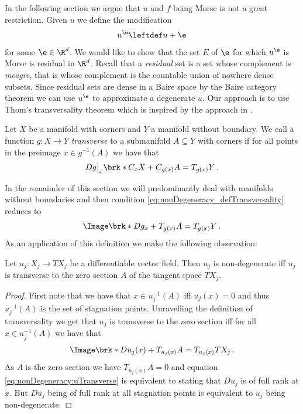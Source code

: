 In the following section we argue that 
$u$ and $f$ being Morse is not a great restriction.
Given $u$ we define the modification
\begin{align}
  u^\e\leftdef u+\e\label{eq:nonDegeneracy:definitionUEps}
\end{align}
for some $\e\in\R^d$. We would like to show that the set $E$ of $\e$ for which $u^\e$ is Morse
is residual in $\R^d$.
Recall that a \emph{residual} set is a set whose complement is \emph{meagre}, that is whose complement
is the countable union of nowhere dense subsets.
Since residual sets are dense in a Baire space by the Baire category theorem we can 
use $u^\e$ to approximate a degenerate $u$.
Our approach is to use Thom's transversality theorem which is inspired by the approach in \cite[Chapter 6]{Hirsch1994}.
\begin{definition}
  Let $X$ be a manifold with corners and $Y$ a manifold without boundary.
  We call a function $g\colon X\to Y$
  \emph{transverse} to a submanifold $A\subseteq Y$ with corners if for all points in the 
  preimage $x\in g^{-1}(A)$ we have that
  \begin{align}
    Dg\big\vert_x\brk*{C_xX}+C_{g(x)}A = T_{g(x)}Y\,.\label{eq:nonDegeneracy_defTransversality}
  \end{align}
\end{definition}
In the remainder of this section we will predominantly deal with manifolds without boundaries and then condition
\eqref{eq:nonDegeneracy_defTransversality} reduces to
\begin{align*}
  \Image\brk*{Dg_x}+T_{g(x)}A = T_{g(x)}Y\,.
\end{align*}
As an application of this definition we make the following observation:
\begin{proposition}\label{pr:nonDegeneracy:alternativeCharacterisation}
  Let $u_j\colon X_j\to TX_j$ be a differentiable vector field.
  Then $u_j$ is non-degenerate iff $u_j$ is transverse to the zero section $A$ of the tangent space $TX_j$.
\end{proposition}
\begin{proof}
  First note that we have that $x\in u_j^{-1}(A)$ iff $u_j(x)=0$ and thus $u_j^{-1}(A)$ is the set of stagnation points.
  Unravelling the definition of transversality we get that $u_j$ is transverse to the zero section iff for all $x\in u_j^{-1}(A)$
  we have that
  \begin{align}
    \Image\brk*{Du_j(x)}+T_{u_j(x)}A = T_{u_j(x)}TX_j\,. \label{eq:nonDegeneracy:uTransverse}
  \end{align}
  As $A$ is the zero section we have $T_{u_j(x)}A=0$ and equation \eqref{eq:nonDegeneracy:uTransverse}
  is equivalent to stating that $Du_j$ is of full rank at $x$. But $Du_j$ being of full rank at all stagnation points
  is equivalent to $u_j$ being non-degenerate.
\end{proof}
